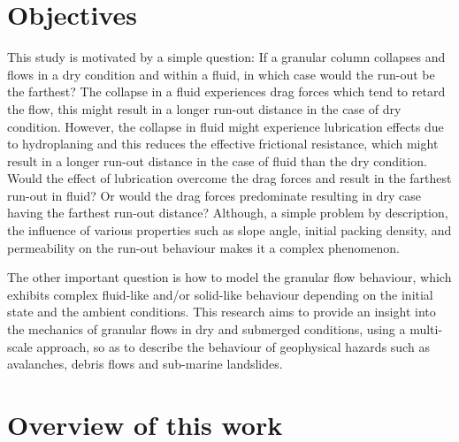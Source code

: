 \section{Objectives}

This study is motivated by a simple question: If a granular column collapses 
and flows in a dry condition and within a fluid, in which case would the 
run-out be the farthest? The collapse in a fluid experiences drag forces which 
tend to retard the flow, this might result in a longer run-out distance in the 
case of dry condition. However, the collapse in fluid might experience 
lubrication effects due to hydroplaning and this reduces the effective 
frictional resistance, which might result in a longer run-out distance in the 
case of fluid than the dry condition. Would the effect of lubrication overcome 
the drag forces and result in the farthest run-out in fluid? Or would the drag 
forces predominate resulting in dry case having the farthest run-out 
distance? Although, a simple problem by description, the influence of various 
properties such as slope angle, initial packing density, and permeability on 
the run-out behaviour makes it a complex phenomenon.

The other important question is how to model the granular flow behaviour, which 
exhibits complex fluid-like and/or solid-like behaviour depending on the 
initial state and the ambient conditions. This research aims to 
provide an insight into the mechanics of granular flows in dry and 
submerged conditions, using a multi-scale approach, so as to describe the 
behaviour of geophysical hazards such as avalanches, debris flows and 
sub-marine landslides.

\section{Overview of this work}

